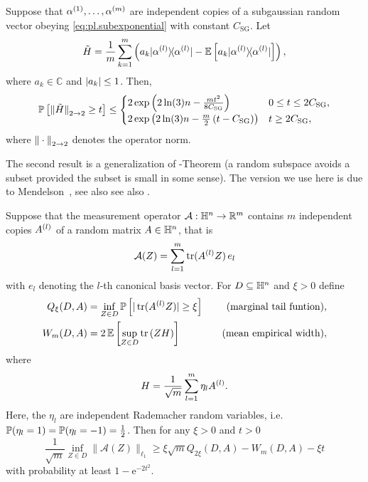 \begin{theorem}%
  \label{thm:bernstein}
  Suppose that $\alpha^{(1)},\ldots,\alpha^{(m)}$ are independent copies of a subgaussian random vector obeying \cref{eq:pl.subexponential} with constant $C_\mathrm{SG}$.
  Let
  \[
    \tilde{ H} = \frac{1}{m} \sum_{k=1}^m \left( a_k \ketbra{\alpha\ind{l}} - \mathbb{E} \left[ a_k \ketbra{\alpha\ind{l}} \right] \right),
    \label{eq:pl.Htilde}
  \]
  where $a_k \in \mathbb{C}$ and ${\vert a_k\vert} \leq 1$.
  Then,
  \begin{align}
    \mathbb{P} \left[ {\Vert\tilde{ H}\Vert}_{2 \to 2} \geq t \right]
    \leq
    \begin{cases}
      2 \exp \left( 2 \ln (3) n  - \frac{mt^2}{8 C_\mathrm{SG}} \right) & 0 \leq t \leq 2C_\mathrm{SG}, \\
      2 \exp \left( 2 \ln (3) n - \frac{m}{2} \left( t - C_\mathrm{SG} \right)  \right) & t \geq 2 C_\mathrm{SG},
    \end{cases}
  \end{align}
  where ${\Vert\cdot\Vert}_{2 \to 2}$ denotes the operator norm.
\end{theorem}

The second result is a generalization of -Theorem \cite{Gordon_1988_On} (a random subspace avoids a subset provided the subset is small in some sense).
The version we use here is due to Mendelson~\cite{Mendelson_2015_Learning,Koltchinskii_2015_Bounding}, see also see also \cite{Tropp_2014_Convex}.

\begin{theorem}%
  \label{thm:mendelson}
  Suppose that the measurement operator $\mathcal{A}:\mathbb{H}^n \to \mathbb{R}^m$ contains $m$ independent copies $A^{(l)}$ of a random matrix $ A \in \mathbb{H}^n$, that is
  \[
    \label{eq:pl.measurement_operator_definition}
    \mathcal{A}(Z) = \sum_{l=1}^m \operatorname{tr} (A^{(l)}  Z) \,  {e_l}
  \]
  with $e_l$ denoting the $l$-th canonical basis vector.
  For $D \subseteq \mathbb{H}^n$ and $\xi >0$ define
  \begin{align}
    Q_\xi (D,  A) &= \inf_{ Z \in D}\mathbb{P} \left[ | \operatorname{tr} (A^{(l)}  Z) | \geq \xi \right] \quad &\textrm{(marginal tail funtion)}, \label{eq:pl.marginal_tail_function}\\
    W_m (D,  A) &= 2 \, \mathbb{E} \left[ \sup_{ Z \in D} \operatorname{tr} \left(  Z  H \right) \right] \quad &\textrm{(mean empirical width)},
  \end{align}
  where
  \[
    H= \frac{1}{\sqrt{m}} \sum_{l=1}^m \eta_l A^{(l)}.
  \]
  Here, the $\eta_l$ are independent Rademacher random variables, i.e.\ $\mathbb{P}(\eta_l = 1) = \mathbb{P}(\eta_l=-1) = \frac{1}{2}$.
  Then for any $\xi >0$ and $t >0$
  \[
    \frac{1}{\sqrt{m}}\inf_{ Z \in D} \| \mathcal{A}( Z) \|_{\ell_1} \geq \xi \sqrt{m} Q_{2\xi}(D,  A) -  W_m (D,  A)-\xi t \label{eq:pl.mendelson}
  \]
  with probability at least $1-\mathrm{e}^{-2t^2}$.
\end{theorem}

